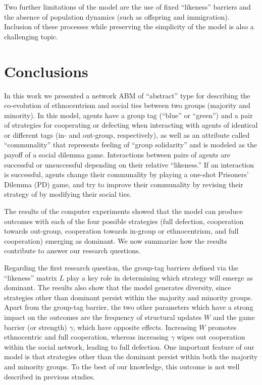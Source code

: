 Two further limitations of the model are the use of fixed ``likeness'' barriers and the absence of population dynamics (such as offspring and immigration). Inclusion of these processes while preserving the simplicity of the model is also a challenging topic. 

\section{Conclusions}
In this work we presented a network ABM of ``abstract'' type for describing the co-evolution of ethnocentrism and social ties between two groups (majority and minority). In this model, agents have a group tag (``blue'' or ``green'') and a pair of strategies for cooperating or defecting when interacting with agents of identical or different tags (in- and out-group, respectively), as well as an attribute called ``communality'' that represents feeling of ``group solidarity'' and is modeled as the payoff of a social dilemma game. Interactions between pairs of agents are successful or unsuccessful depending on their relative ``likeness.'' If an interaction is successful, agents change their communality by playing a one-shot Prisoners' Dilemma (PD) game, and try to improve their communality by revising their strategy of by modifying their social ties.

The results of the computer experiments showed that the model can produce outcomes with each of the four possible strategies (full defection, cooperation towards out-group, cooperation towards in-group or ethnocentrism, and full cooperation) emerging as dominant. We now summarize how the results contribute to answer our research questions. 

Regarding the first research question, the group-tag barriers defined via the ``likeness'' matrix $ L $ play a key role in determining which strategy will emerge as dominant. The results also show that the model generates diversity, since strategies other than dominant persist within the majority and minority groups. Apart from the group-tag barrier, the two other parameters which have a strong impact on the outcomes are the frequency of structural updates $ W $ and the game barrier (or strength) $ \gamma $, which have opposite effects. Increasing $ W $ promotes ethnocentric and full cooperation, whereas increasing $ \gamma $ wipes out cooperation within the social network, leading to full defection. One important feature of our model is that strategies other than the dominant persist within both the majority and minority groups. To the best of our knowledge, this outcome is not well described in previous studies.  

